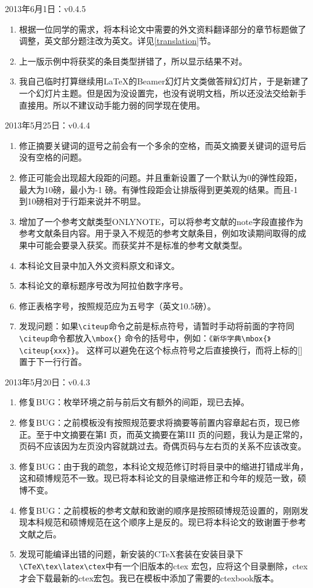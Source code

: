 \noindent
2013年6月1日：v0.4.5
\begin{enumerate}
\item 根据一位同学的需求，将本科论文中需要的外文资料翻译部分的章节标题做了调整，英文部分题注改为英文。详见\ref{translation}节。
\item 上一版示例中将获奖的条目类型拼错了，所以显示结果不对。
\item 我自己临时打算继续用LaTeX的Beamer幻灯片文类做答辩幻灯片，于是新建了一个幻灯片主题。但是因为没设置完，也没有说明文档，所以还没法交给新手直接用。所以不建议动手能力弱的同学现在使用。
\end{enumerate}

\noindent
2013年5月25日：v0.4.4
\begin{enumerate}
\item 修正摘要关键词的逗号之前会有一个多余的空格，而英文摘要关键词的逗号后没有空格的问题。
\item 修正可能会出现超大段距的问题。并且重新设置了一个默认为0的弹性段距，最大为10磅，最小为-1 磅。有弹性段距会让排版得到更美观的结果。而且-1 到10磅相对于行距来说并不明显。
\item 增加了一个参考文献类型ONLYNOTE，可以将参考文献的note字段直接作为参考文献条目内容。用于录入不规范的参考文献条目，例如攻读期间取得的成果中可能会要录入获奖\cite{onlynoteexample}。而获奖并不是标准的参考文献类型。
\item 本科论文目录中加入外文资料原文和译文。
\item 本科论文的章标题序号改为阿拉伯数字序号。
\item 修正表格字号，按照规范应为五号字（英文10.5磅）。
\item 发现问题：如果\verb|\citeup|命令之前是标点符号，请暂时手动将前面的字符同\verb|\citeup|命令都放入\verb|\mbox{}| 命令的括号中，例如：\verb|《新华字典\mbox{》\citeup{xxx}}|。 这样可以避免在这个标点符号之后直接换行，而将上标的[] 置于下一行行首。
\end{enumerate}

\noindent
2013年5月20日：v0.4.3
\begin{enumerate}
\item 修复BUG：枚举环境之前与前后文有额外的间距，现已去掉。
\item 修复BUG：之前模板没有按照规范要求将摘要等前置内容章起右页，现已修正。至于中文摘要在第I 页，而英文摘要在第III 页的问题，我认为是正常的，页码不应该因为左页没内容就跳过去。奇偶页码与左右页的关系不应该改变。
\item 修复BUG：由于我的疏忽，本科论文规范修订时将目录中的缩进打错成半角，这和硕博规范不一致。现已将本科论文的目录缩进修正和今年的规范一致，硕博不变。
\item 修复BUG：之前模板的参考文献和致谢的顺序是按照硕博规范设置的，刚刚发现本科规范和硕博规范在这个顺序上是反的。现已将本科论文的致谢置于参考文献之后。
\item 发现可能编译出错的问题，新安装的CTeX套装在安装目录下\verb|\CTeX\tex\latex\ctex|中有一个旧版本的ctex 宏包，应将这个目录删除，ctex 才会下载最新的ctex宏包。我已在模板中添加了需要的ctexbook版本。
\end{enumerate}

